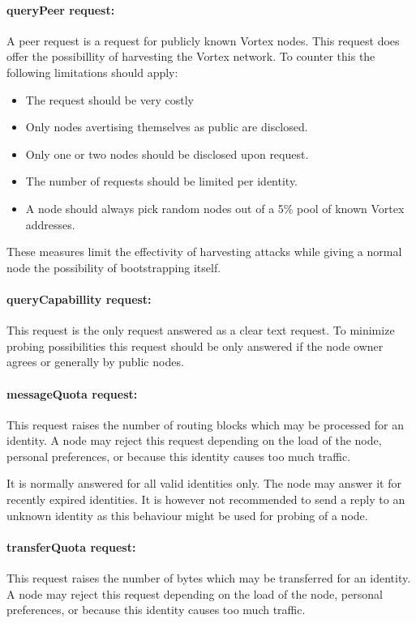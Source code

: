 \paragraph{queryPeer request:} A peer request is a request for publicly known Vortex nodes. This request does offer the possibillity of harvesting the Vortex network. To counter this the following limitations should apply:
\begin{itemize}
	\item The request should be very costly
	\item Only nodes avertising themselves as public are disclosed.
	\item Only one or two nodes should be disclosed upon request.
	\item The number of requests should be limited per identity.
	\item A node should always pick random nodes out of a 5\% pool of known Vortex addresses.
\end{itemize}

These measures limit the effectivity of harvesting attacks while giving a normal node the possibility of bootstrapping itself.

\paragraph{queryCapabillity request:} This request is the only request answered as a clear text request. To minimize probing possibilities this request should be only answered if the node owner agrees or generally by public nodes.

\paragraph{messageQuota request:} This request raises the number of routing blocks which may be processed for an identity. A node may reject this request depending on the load of the node, personal preferences, or because this identity causes too much traffic.

It is normally answered for all valid identities only. The node may answer it for recently expired identities. It is however not recommended to send a reply to an unknown identity as this behaviour might be used for probing of a node.

\paragraph{transferQuota request:} This request raises the number of bytes which may be transferred for an identity. A node may reject this request depending on the load of the node, personal preferences, or because this identity causes too much traffic.

